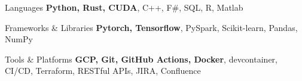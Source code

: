 

\begin{cvskills}

  \cvskill
    {Languages} %
    {\textbf{Python, Rust, CUDA}, C++, F\#, SQL, R, Matlab} %

  \cvskill
    {Frameworks \& Libraries} %
    {\textbf{Pytorch, Tensorflow}, PySpark, Scikit-learn, Pandas, NumPy} %

  \cvskill
    {Tools \& Platforms} %
    {\textbf{GCP, Git, GitHub Actions, Docker}, devcontainer, CI/CD, Terraform, RESTful APIs, JIRA, Confluence} %


\end{cvskills}
